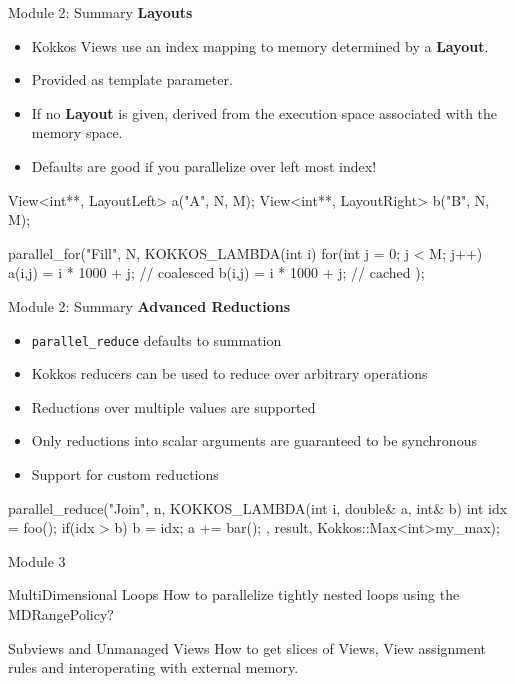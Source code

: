 \begin{frame}[fragile]{Module 2: Summary}
	\textbf{Layouts}
	\begin{itemize}
		\item Kokkos Views use an index mapping to memory determined by a \textbf{Layout}.
		\item Provided as template parameter.
		\item If no \textbf{Layout} is given, derived from the execution space associated with the memory space.
		\item Defaults are good if you parallelize over left most index!
	\end{itemize}

\begin{code}[keywords={View,int,CudaSpace}]
	View<int**, LayoutLeft> a("A", N, M);
	View<int**, LayoutRight> b("B", N, M);

	parallel_for("Fill", N, KOKKOS_LAMBDA(int i) {
          for(int j = 0; j < M; j++) {
            a(i,j) = i * 1000 + j; // coalesced
	    b(i,j) = i * 1000 + j; // cached
          }
	});
\end{code}

\end{frame}

\begin{frame}[fragile]{Module 2: Summary}
	\textbf{Advanced Reductions}
	\begin{itemize}
        \item \texttt{parallel\_reduce} defaults to summation
        \item Kokkos reducers can be used to reduce over arbitrary operations
        \item Reductions over multiple values are supported
        \item Only reductions into scalar arguments are guaranteed to be synchronous
        \item Support for custom reductions
	\end{itemize}

\begin{code}[keywords={View,int,CudaSpace}]
    parallel_reduce("Join", n,
      KOKKOS_LAMBDA(int i, double& a, int& b) {
        int idx = foo();
        if(idx > b) b = idx;
        a += bar();
      }, result, Kokkos::Max<int>{my_max});
\end{code}

\end{frame}

\begin{frame}{Module 3}
  \begin{block}{MultiDimensional Loops}
    How to parallelize tightly nested loops using the MDRangePolicy?
  \end{block}

  \begin{block}{Subviews and Unmanaged Views}
    How to get slices of Views, View assignment rules and interoperating with external memory.
  \end{block}
\end{frame}

